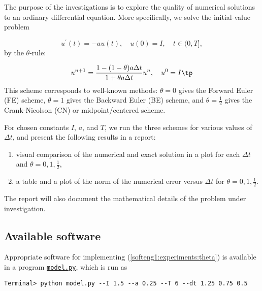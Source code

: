 \documentclass[graybox,sectrefs,envcountresetchap,open=right,final]{svmonodo}
\newenvironment{notice_mdfboxadmon}[1][]{
\begin{notice_mdfboxmdframed}[frametitle=#1]
}
{
\end{notice_mdfboxmdframed}
}
\begin{document}
\begin{notice_mdfboxadmon}
The purpose of the investigations is to explore the quality of numerical
solutions to an ordinary differential equation. More specifically, we
solve the initial-value problem

\begin{equation}
u^\prime(t) = -au(t),\quad u(0)=I,\quad t\in (0,T],
\label{softeng1:experiments:model}
\end{equation}
by the $\theta$-rule:

\begin{equation}
u^{n+1} = \frac{1 - (1-\theta) a\Delta t}{1 + \theta a\Delta t}u^n,
\quad u^0=I\tp
\label{softeng1:experiments:theta}
\end{equation}
This scheme corresponds to well-known methods: $\theta=0$ gives the
Forward Euler (FE) scheme, $\theta=1$ gives the Backward Euler (BE) scheme,
and $\theta=\frac{1}{2}$ gives the Crank-Nicolson
(CN) or midpoint/centered scheme.

For chosen constants $I$, $a$, and $T$, we run the three schemes for various
values of $\Delta t$, and present the following results in a report:

\begin{enumerate}
\item visual comparison of the numerical and exact solution in a plot for each $\Delta t$ and $\theta=0,1,\frac{1}{2}$,

\item a table and a plot of the norm of the numerical error versus $\Delta t$ for $\theta=0,1,\frac{1}{2}$.
\end{enumerate}

\noindent
The report will also document the mathematical details of the problem under
investigation.
\end{notice_mdfboxadmon} %



\subsection{Available software}

Appropriate software for implementing (\ref{softeng1:experiments:theta})
is available in a program \href{{http://tinyurl.com/nc4upel/doconce_src/model.py}}{\nolinkurl{model.py}}, which is run as



\begin{Verbatim}[frame=lines,label=\fbox{{\tiny Terminal}},framesep=2.5mm,framerule=0.7pt,fontsize=\fontsize{9pt}{9pt}]
Terminal> python model.py --I 1.5 --a 0.25 --T 6 --dt 1.25 0.75 0.5

\end{Verbatim}
\end{document}
